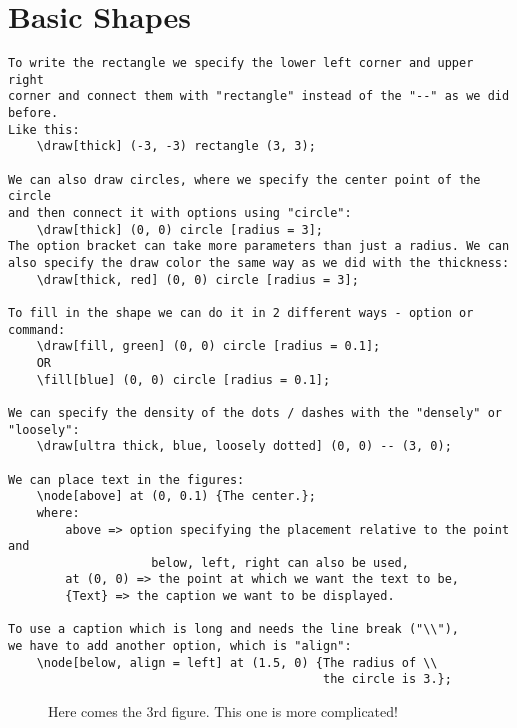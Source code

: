 \documentclass[12pt,titlepage]{article}
\begin{document}
\newpage
\section{Basic Shapes}

\begin{verbatim}
To write the rectangle we specify the lower left corner and upper right
corner and connect them with "rectangle" instead of the "--" as we did before.
Like this:
    \draw[thick] (-3, -3) rectangle (3, 3);

We can also draw circles, where we specify the center point of the circle
and then connect it with options using "circle":
    \draw[thick] (0, 0) circle [radius = 3];
The option bracket can take more parameters than just a radius. We can also specify the draw color the same way as we did with the thickness:
    \draw[thick, red] (0, 0) circle [radius = 3];

To fill in the shape we can do it in 2 different ways - option or command:
    \draw[fill, green] (0, 0) circle [radius = 0.1];
    OR
    \fill[blue] (0, 0) circle [radius = 0.1];

We can specify the density of the dots / dashes with the "densely" or "loosely":
    \draw[ultra thick, blue, loosely dotted] (0, 0) -- (3, 0);

We can place text in the figures:
    \node[above] at (0, 0.1) {The center.};
    where:
        above => option specifying the placement relative to the point and
                    below, left, right can also be used,
        at (0, 0) => the point at which we want the text to be,
        {Text} => the caption we want to be displayed.

To use a caption which is long and needs the line break ("\\"),
we have to add another option, which is "align":
    \node[below, align = left] at (1.5, 0) {The radius of \\
                                            the circle is 3.};
\end{verbatim}

\begin{figure}[h]
    \centering
    \caption{Here comes the 3rd figure. This one is more complicated!}
\end{figure}
\end{document}
